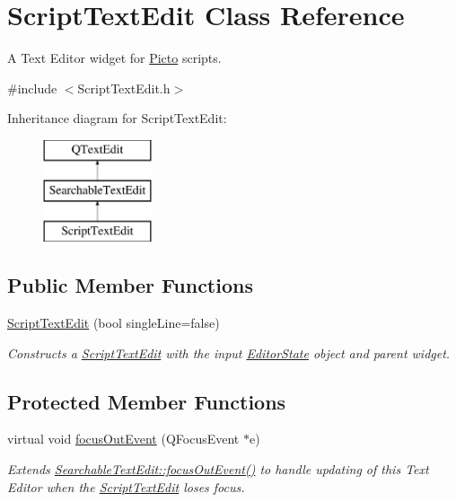 \hypertarget{class_script_text_edit}{\section{Script\-Text\-Edit Class Reference}
\label{class_script_text_edit}
}


A Text Editor widget for \hyperlink{namespace_picto}{Picto} scripts.  




{\ttfamily \#include $<$Script\-Text\-Edit.\-h$>$}

Inheritance diagram for Script\-Text\-Edit\-:\begin{figure}[H]
\begin{center}
\leavevmode
\includegraphics[height=3.000000cm]{class_script_text_edit}
\end{center}
\end{figure}
\subsection*{Public Member Functions}
\begin{DoxyCompactItemize}
\item 
\hypertarget{class_script_text_edit_a123fe60902b21fb843bbccf5ee094b57}{\hyperlink{class_script_text_edit_a123fe60902b21fb843bbccf5ee094b57}{Script\-Text\-Edit} (bool single\-Line=false)}\label{class_script_text_edit_a123fe60902b21fb843bbccf5ee094b57}

\begin{DoxyCompactList}\small\item\em Constructs a \hyperlink{class_script_text_edit}{Script\-Text\-Edit} with the input \hyperlink{class_editor_state}{Editor\-State} object and parent widget. \end{DoxyCompactList}\end{DoxyCompactItemize}
\subsection*{Protected Member Functions}
\begin{DoxyCompactItemize}
\item 
virtual void \hyperlink{class_script_text_edit_a2b458e8de5efc0ec00378b4075c66d1b}{focus\-Out\-Event} (Q\-Focus\-Event $\ast$e)
\begin{DoxyCompactList}\small\item\em Extends \hyperlink{class_searchable_text_edit_a8622cfa9536e40d76cfb1fb84f7ffc7c}{Searchable\-Text\-Edit\-::focus\-Out\-Event()} to handle updating of this Text Editor when the \hyperlink{class_script_text_edit}{Script\-Text\-Edit} loses focus. \end{DoxyCompactList}\end{DoxyCompactItemize}

